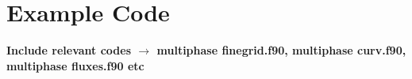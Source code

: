 \chapter{Example Code}\label{appendixa}
\textbf{ Include relevant codes $\rightarrow$ multiphase finegrid.f90, multiphase curv.f90, multiphase fluxes.f90 etc }
